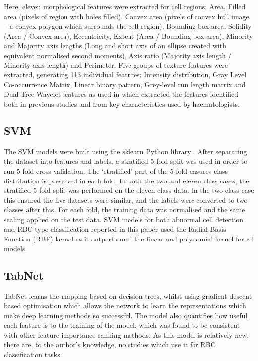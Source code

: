 \documentclass[final,5p,times,twocolumn,authoryear]{elsarticle}
\begin{document}
Here, eleven morphological features were extracted for cell regions; Area, Filled area (pixels of region with holes filled), Convex area (pixels of convex hull image – a convex polygon which surrounds the cell region), Bounding box area, Solidity (Area / Convex area), Eccentricity, Extent (Area / Bounding box area), Minority and Majority axis lengths (Long and short axis of an ellipse created with equivalent normalised second moments), Axis ratio (Majority axis length / Minority axis length) and Perimeter. Five groups of texture features were extracted, generating 113 individual features: Intensity distribution, Gray Level Co-occurrence Matrix, Linear binary pattern, Grey-level run length matrix and Dual-Tree Wavelet features as used in \citep{Anantrasirichai2014Adaptive-weightedTomography} which extracted the features identified both in previous studies and from key characteristics used by haematologists.

\subsection{SVM}
\label{sec:svmmethod}

The SVM models were built using the sklearn Python library \citep{Pedregosa2011Scikit-learn:Python}. After separating the dataset into features and labels, a stratified 5-fold split was used in order to run 5-fold cross validation. The `stratified' part of the 5-fold ensures class distribution is preserved in each fold. In both the two and eleven class cases, the stratified 5-fold split was performed on the eleven class data. In the two class case this ensured the five datasets were similar, and the labels were converted to two classes after this. For each fold, the training data was normalised and the same scaling applied on the test data.  SVM models for both abnormal cell detection and RBC type classification reported in this paper used the Radial Basis Function (RBF) kernel as it outperformed the linear and polynomial kernel for all models.

\subsection{TabNet}
\label{sec:tabnetmethod}

TabNet learns the mapping based on decision trees, whilst using gradient descent-based optimisation which allows the network to learn the representations which make deep learning methods so successful. The model also quantifies how useful each feature is to the training of the model, which was found to be consistent with other feature importance ranking methods. As this model is relatively new, there are, to the author's knowledge, no studies which use it for RBC classification tasks.
\smallskip
\end{document}
